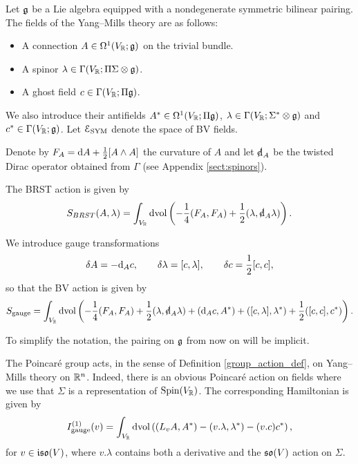 \documentclass[10pt, oneside]{article}
\newcommand{\gauge}{\mathrm{gauge}}
\begin{document}
Let $\mathfrak g$ be a Lie algebra equipped with a nondegenerate symmetric bilinear pairing. The fields of the Yang--Mills theory are as follows:
\begin{itemize}
\item A connection $A \in \Omega^1(V_\mathbb R; \mathfrak g)$ on the trivial bundle.

\item A spinor $\lambda \in \Gamma(V_\mathbb R; \Pi \Sigma \otimes \mathfrak g)$.

\item A ghost field $c\in\Gamma(V_\mathbb R; \Pi\mathfrak g)$.
\end{itemize}
We also introduce their antifields $A^*\in\Omega^1(V_\mathbb R; \Pi\mathfrak g)$, $\lambda\in\Gamma(V_\mathbb R; \Sigma^*\otimes \mathfrak g)$ and $c^*\in\Gamma(V_\mathbb R; \mathfrak g)$.
Let $\mathcal E_{\rm SYM}$ denote the space of BV fields. 

Denote by $F_A = {\rm d} A + \frac{1}{2}[A\wedge A]$ the curvature of $A$ and let $\sd\d_A$ be the twisted Dirac operator obtained from $\Gamma$ (see Appendix \ref{sect:spinors}).

The BRST action is given by
\[S_{BRST}(A, \lambda) = \int_{V_\RR}\dvol \left( -\frac{1}{4} (F_A, F_A) + \frac{1}{2}(\lambda, \sd \d_A \lambda)\right).\]

We introduce gauge transformations
\[\delta A = -{\rm d}_A c,\qquad \delta \lambda = [c, \lambda],\qquad \delta c = \frac{1}{2}[c, c],\]
so that the BV action is given by
\begin{equation}
S_{\gauge} = \int_{V_\RR}\dvol \left( -\frac{1}{4} (F_A, F_A) + \frac{1}{2}(\lambda, \sd\d_A \lambda) + (\d_A c, A^*) + ([c, \lambda], \lambda^*) + \frac{1}{2}([c, c], c^*)\right).
\label{eq:YMBVaction}
\end{equation}

To simplify the notation, the pairing on $\mathfrak g$ from now on will be implicit.

The Poincar\'e group acts, in the sense of Definition \ref{group_action_def}, on Yang--Mills theory on $\mathbb R^n$. Indeed, there is an obvious Poincar\'e action on fields where we use that $\Sigma$ is a representation of $\mathrm{Spin}(V_\mathbb R)$. The corresponding Hamiltonian is given by
\begin{equation}
I_{\gauge}^{(1)}(v) = \int_{V_\RR}\dvol\left( (L_{v}A, A^*) - (v.\lambda, \lambda^*) - (v.c)c^*\right),
\label{eq:YMPoincareaction}
\end{equation}
for $v\in\mathfrak{iso}(V)$, where $v.\lambda$ contains both a derivative and the $\mathfrak{so}(V)$ action on $\Sigma$.
\end{document}
